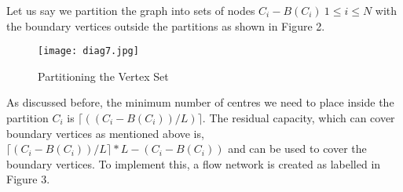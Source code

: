 \documentclass[12pt,a4paper,onecolumn]{article}
\begin{document}
Let us say we partition the graph into sets of nodes $C_i - B(C_i) \: 1 \leq i \leq N$ with the boundary vertices outside the partitions as shown in Figure 2.

\begin{flushright}
\begin{figure}[H]
\texttt{[image: diag7.jpg]}
\caption{Partitioning the Vertex Set}
\end{figure}
\end{flushright}

As discussed before, the minimum number of centres we need to place inside the partition $C_i$ is $\lceil ((C_i-B(C_i))/L) \rceil$. The residual capacity, which can cover boundary vertices as mentioned above is, $\lceil (C_i-B(C_i))/L\rceil*L-(C_i-B(C_i))$ and can be used to cover the boundary vertices. To implement this, a flow network is created as labelled in Figure 3.
\end{document}
